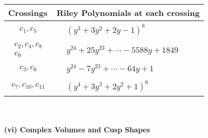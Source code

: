 \documentclass[1p]{elsarticle_modified}
\theoremstyle{definition}
\begin{document}
\begin{tabular}{m{50pt}|m{274pt}}
Crossings & \hspace{64pt}Riley Polynomials at each crossing \\
\hline $$\begin{aligned}c_{1},c_{5}\end{aligned}$$&$\begin{aligned}
&(y^3+3 y^2+2 y-1)^8
\end{aligned}$\\
\hline $$\begin{aligned}c_{2},c_{4},c_{8}\\c_{9}\end{aligned}$$&$\begin{aligned}
&y^{24}+25 y^{23}+\cdots-5588 y+1849
\end{aligned}$\\
\hline $$\begin{aligned}c_{3},c_{6}\end{aligned}$$&$\begin{aligned}
&y^{24}-7 y^{23}+\cdots-64 y+1
\end{aligned}$\\
\hline $$\begin{aligned}c_{7},c_{10},c_{11}\end{aligned}$$&$\begin{aligned}
&(y^4+3 y^3+2 y^2+1)^6
\end{aligned}$\\
\hline
\end{tabular}\\~\\
\newpage\flushleft \textbf{(vi) Complex Volumes and Cusp Shapes}
\end{document}
